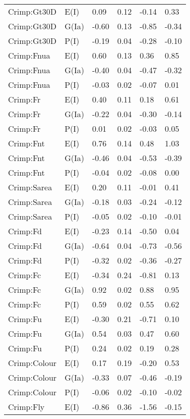 \begin{center}
\begin{longtable}{|p{1.1in}|p{0.7in}|p{0.7in}|p{0.6in}|p{0.6in}|p{0.6in}|}
  Crimp:Gt30D & E(I) & 0.09 & 0.12 & -0.14 & 0.33 \\ 
  Crimp:Gt30D & G(Ia) & -0.60 & 0.13 & -0.85 & -0.34 \\ 
  Crimp:Gt30D & P(I) & -0.19 & 0.04 & -0.28 & -0.10 \\ 
  Crimp:Fnua & E(I) & 0.60 & 0.13 & 0.36 & 0.85 \\ 
  Crimp:Fnua & G(Ia) & -0.40 & 0.04 & -0.47 & -0.32 \\ 
  Crimp:Fnua & P(I) & -0.03 & 0.02 & -0.07 & 0.01 \\ 
  Crimp:Fr & E(I) & 0.40 & 0.11 & 0.18 & 0.61 \\ 
  Crimp:Fr & G(Ia) & -0.22 & 0.04 & -0.30 & -0.14 \\ 
  Crimp:Fr & P(I) & 0.01 & 0.02 & -0.03 & 0.05 \\ 
  Crimp:Fnt & E(I) & 0.76 & 0.14 & 0.48 & 1.03 \\ 
  Crimp:Fnt & G(Ia) & -0.46 & 0.04 & -0.53 & -0.39 \\ 
  Crimp:Fnt & P(I) & -0.04 & 0.02 & -0.08 & 0.00 \\ 
  Crimp:Sarea & E(I) & 0.20 & 0.11 & -0.01 & 0.41 \\ 
  Crimp:Sarea & G(Ia) & -0.18 & 0.03 & -0.24 & -0.12 \\ 
  Crimp:Sarea & P(I) & -0.05 & 0.02 & -0.10 & -0.01 \\ 
  Crimp:Fd & E(I) & -0.23 & 0.14 & -0.50 & 0.04 \\ 
  Crimp:Fd & G(Ia) & -0.64 & 0.04 & -0.73 & -0.56 \\ 
  Crimp:Fd & P(I) & -0.32 & 0.02 & -0.36 & -0.27 \\ 
  Crimp:Fc & E(I) & -0.34 & 0.24 & -0.81 & 0.13 \\ 
  Crimp:Fc & G(Ia) & 0.92 & 0.02 & 0.88 & 0.95 \\ 
  Crimp:Fc & P(I) & 0.59 & 0.02 & 0.55 & 0.62 \\ 
  Crimp:Fu & E(I) & -0.30 & 0.21 & -0.71 & 0.10 \\ 
  Crimp:Fu & G(Ia) & 0.54 & 0.03 & 0.47 & 0.60 \\ 
  Crimp:Fu & P(I) & 0.24 & 0.02 & 0.19 & 0.28 \\ 
  Crimp:Colour & E(I) & 0.17 & 0.19 & -0.20 & 0.53 \\ 
  Crimp:Colour & G(Ia) & -0.33 & 0.07 & -0.46 & -0.19 \\ 
  Crimp:Colour & P(I) & -0.06 & 0.02 & -0.10 & -0.02 \\ 
  Crimp:Fly & E(I) & -0.86 & 0.36 & -1.56 & -0.15 \\ 

\end{longtable}
\end{center}
